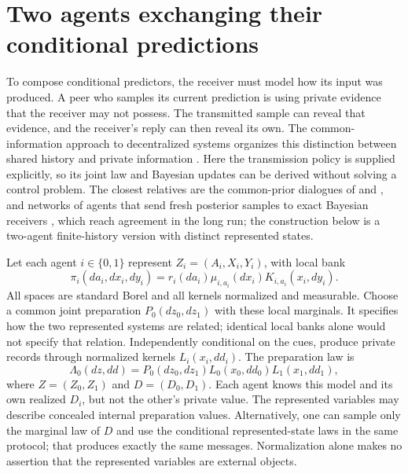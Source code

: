 \section{Two agents exchanging their conditional predictions}
\label{comp:interacting-memory}

To compose conditional predictors, the receiver must model how its input was produced. A peer who samples its current prediction is using private evidence that the receiver may not possess. The transmitted sample can reveal that evidence, and the receiver's reply can then reveal its own. The common-information approach to decentralized systems organizes this distinction between shared history and private information \citep{Nayyar2013CommonInformation}. Here the transmission policy is supplied explicitly, so its joint law and Bayesian updates can be derived without solving a control problem. The closest relatives are the common-prior dialogues of \citet{Aumann1976} and \citet{GeanakoplosPolemarchakis1982}, and networks of agents that send fresh posterior samples to exact Bayesian receivers \citep{DeshpandeMosselSohn2022}, which reach agreement in the long run; the construction below is a two-agent finite-history version with distinct represented states.

Let each agent $i\in\{0,1\}$ represent $Z_i=(A_i,X_i,Y_i)$, with local bank
\begin{equation}
\pi_i(da_i,dx_i,dy_i)
=r_i(da_i)\mu_{i,a_i}(dx_i)K_{i,a_i}(x_i,dy_i).
\label{comp:eq-interaction-bank}
\end{equation}
All spaces are standard Borel and all kernels normalized and measurable. Choose a common joint preparation $P_0(dz_0,dz_1)$ with these local marginals. It specifies how the two represented systems are related; identical local banks alone would not specify that relation. Independently conditional on the cues, produce private records through normalized kernels $L_i(x_i,dd_i)$. The preparation law is
\begin{equation}
\Lambda_0(dz,dd)
=P_0(dz_0,dz_1)L_0(x_0,dd_0)L_1(x_1,dd_1),
\label{comp:eq-interaction-preparation}
\end{equation}
where $Z=(Z_0,Z_1)$ and $D=(D_0,D_1)$. Each agent knows this model and its own realized $D_i$, but not the other's private value. The represented variables may describe concealed internal preparation values. Alternatively, one can sample only the marginal law of $D$ and use the conditional represented-state laws in the same protocol; that produces exactly the same messages. Normalization alone makes no assertion that the represented variables are external objects.

